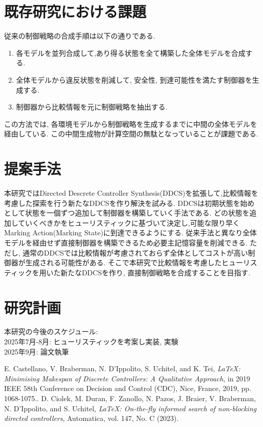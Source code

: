 \documentclass[11pt]{jarticle}
\begin{document}
\section{既存研究における課題}
従来の制御戦略の合成手順\cite{eze}は以下の通りである.
\begin{enumerate}
    \item 各モデルを並列合成して,あり得る状態を全て構築した全体モデルを合成する.
    \item 全体モデルから違反状態を削減して, 安全性, 到達可能性を満たす制御器を生成する.
    \item 制御器から比較情報を元に制御戦略を抽出する.
\end{enumerate}
この方法では, 各環境モデルから制御戦略を生成するまでに中間の全体モデルを経由している. この中間生成物が計算空間の無駄となっていることが課題である.

\section{提案手法}
本研究ではDirected Descrete Controller Synthesis(DDCS)\cite{ddcs}を拡張して,比較情報を考慮した探索を行う新たなDDCSを作り解決を試みる.
DDCSは初期状態を始めとして状態を一個ずつ追加して制御器を構築していく手法である. どの状態を追加していくべきかをヒューリスティックに基づいて決定し,可能な限り早くMarking Action(Marking State)に到達できるようにする. 従来手法と異なり全体モデルを経由せず直接制御器を構築できるため必要主記憶容量を削減できる. ただし, 通常のDDCSでは比較情報が考慮されておらず全体としてコストが高い制御器が生成される可能性がある. そこで本研究で比較情報を考慮したヒューリスティックを用いた新たなDDCSを作り, 直接制御戦略を合成することを目指す.

\section{研究計画}
本研究の今後のスケジュール:\\
2025年7月-8月: ヒューリスティックを考案し実装, 実験 \\
2025年9月: 論文執筆

\appendix %
\begin{thebibliography}{99} %
 E. Castellano, V. Braberman, N. D'Ippolito, S. Uchitel, and K. Tei, %
{\it \LaTeX : Minimising
Makespan of Discrete Controllers: A Qualitative Approach},
in 2019 IEEE 58th
Conference on Decision and Control (CDC), Nice, France, 2019, pp. 1068-1075..
D. Ciolek, M. Duran, F. Zanollo, N. Pazos, J. Braier, V. Braberman, N. D'Ippolito, and S.
Uchitel, %
{\it \LaTeX : On-the-fly informed search of non-blocking directed controllers},
Automatica, vol. 147, No. C (2023).

\end{thebibliography} %
\end{document}
